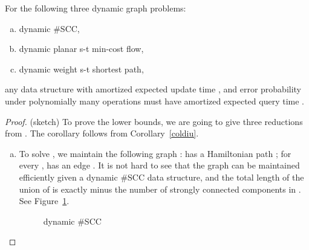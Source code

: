 \documentclass[11pt]{article}
\begin{document}
{\begin{corollary}\label{cordyngraph}
For the following three dynamic graph problems:
\begin{enumerate}[(a)]
	\item
		dynamic \#SCC,
	\item
		dynamic planar s-t min-cost flow,
	\item
		dynamic weight s-t shortest path,
\end{enumerate}
any data structure with amortized expected update time , and error probability  under polynomially many operations must have amortized expected query time . 
\end{corollary}

\begin{proof}(sketch)
To prove the lower bounds, we are going to give three reductions from \diu{}. The corollary follows from Corollary~\ref{coldiu}. 
\begin{enumerate}[(a)]
	\item To solve \diu{}, we maintain the following graph :  has a Hamiltonian path ; for every ,  has an edge . It is not hard to see that the graph can be maintained efficiently given a dynamic \#SCC data structure, and the total length of the union of  is exactly  minus the number of strongly connected components in . See Figure~\ref{figscc}. 
	
\begin{figure}
\centering
{}
\caption{dynamic \#SCC}\label{figscc}
\end{figure}


\end{enumerate}
\end{proof}}
\end{document}
